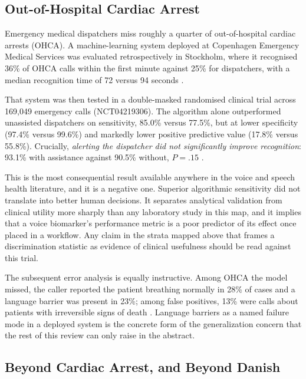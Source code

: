 \documentclass[11pt]{article}
\begin{document}
\subsection{Out-of-Hospital Cardiac Arrest}

Emergency medical dispatchers miss roughly a quarter of out-of-hospital cardiac
arrests (OHCA). A machine-learning system deployed at Copenhagen Emergency
Medical Services was evaluated retrospectively in Stockholm, where it recognised
36\% of OHCA calls within the first minute against 25\% for dispatchers, with a
median recognition time of 72 versus 94 seconds \citep{byrsell2021ml}.

That system was then tested in a double-masked randomised clinical trial across
169,049 emergency calls (NCT04219306). The algorithm alone outperformed
unassisted dispatchers on sensitivity, 85.0\% versus 77.5\%, but at lower
specificity (97.4\% versus 99.6\%) and markedly lower positive predictive value
(17.8\% versus 55.8\%). Crucially, \emph{alerting the dispatcher did not
significantly improve recognition}: 93.1\% with assistance against 90.5\%
without, $P = .15$ \citep{blomberg2021rct}.

This is the most consequential result available anywhere in the voice and speech
health literature, and it is a negative one. Superior algorithmic sensitivity did
not translate into better human decisions. It separates analytical validation
from clinical utility more sharply than any laboratory study in this map, and it
implies that a voice biomarker's performance metric is a poor predictor of its
effect once placed in a workflow. Any claim in the strata mapped above that
frames a discrimination statistic as evidence of clinical usefulness should be
read against this trial.

The subsequent error analysis is equally instructive. Among OHCA the model
missed, the caller reported the patient breathing normally in 28\% of cases and
a language barrier was present in 23\%; among false positives, 13\% were calls
about patients with irreversible signs of death \citep{blomberg2023wrong}.
Language barriers as a named failure mode in a deployed system is the concrete
form of the generalization concern that the rest of this review can only raise
in the abstract.

\subsection{Beyond Cardiac Arrest, and Beyond Danish}
\end{document}
